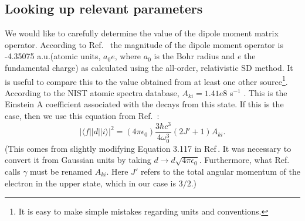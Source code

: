 
\subsection{Looking up relevant parameters} \label{lookItUp}
We would like to carefully determine the value of the dipole moment matrix operator. According to Ref.\ \cite{safronova2photon} the magnitude of the dipole moment operator is -4.35075 a.u.(atomic units, $a_0 e$, where $a_0$ is the Bohr radius and $e$ the fundamental charge) as calculated using the all-order, relativistic SD method. It is useful to compare this to the value obtained from at least one other source\footnote{It is easy to make simple mistakes regarding units and conventions.}. According to the NIST atomic spectra database, $A_{ki}=1.41e8$ s$^{-1}$ \cite{NISTasd}. This is the Einstein A coefficient associated with the decays from this state. If this is the case, then we use this equation from Ref.\ \cite{demilleBudkerKimball}:  
\begin{equation}
|\langle f ||d|| i \rangle|^2 = (4 \pi \epsilon_0) \frac{3 \hbar c^3}{4 \omega_0^3} (2 J'+1) A_{ki}\label{budkerAeqn}.
\end{equation}
(This comes from slightly modifying Equation 3.117 in Ref\,\cite{demilleBudkerKimball}. It was necessary to convert it from Gaussian units by taking $d\rightarrow d \sqrt{4 \pi \epsilon_0}$. Furthermore, what Ref.\ \cite{demilleBudkerKimball} calls $\gamma$ must be renamed $A_{ki}$. Here $J'$ refers to the total angular momentum of the electron in the upper state, which in our case is $3/2$.) 

